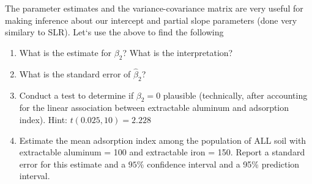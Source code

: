 \documentclass{article}
\begin{document}
The parameter estimates and the variance-covariance matrix are very useful for making inference about our intercept and partial slope parameters (done very similary to SLR).  Let`s use the above to find the following
\begin{enumerate}
\item What is the estimate for $\beta_2$?  What is the interpretation?
\item What is the standard error of $\hat\beta_2$?  
\item Conduct a test to determine if $\beta_2=0$ plausible (technically, after accounting for the linear association between extractable aluminum and adsorption index).  Hint: $t(0.025, 10)=2.228$
\item Estimate the mean adsorption index among the population of ALL soil with extractable aluminum = 100 and extractable iron = 150.  Report a standard error for this estimate and a $95\%$ confidence interval and a 95\% prediction interval.
\end{enumerate}
\end{document}
